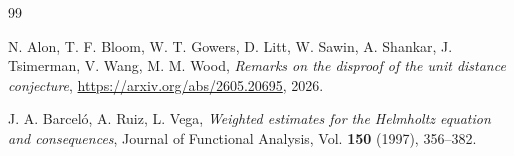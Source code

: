 \documentclass[11pt,reqno]{amsart}
\numberwithin{equation}{section}
\begin{document}
\begin{thebibliography}{99}

 N. Alon, T. F. Bloom, W. T. Gowers, D. Litt, W. Sawin, A. Shankar, J. Tsimerman, V. Wang, M. M. Wood, \textit{Remarks on the disproof of the unit distance conjecture}, \url{https://arxiv.org/abs/2605.20695}, 2026.








 J. A. Barcel\'{o}, A. Ruiz, L. Vega, \textit{Weighted estimates for the Helmholtz equation and consequences}, Journal of Functional Analysis, Vol. \textbf{150} (1997), 356--382.




\end{thebibliography}
\end{document}
